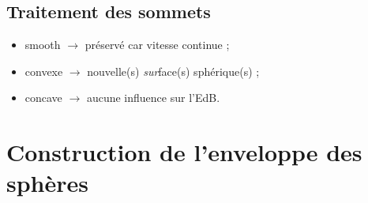 \subsection{Traitement des sommets}
\begin{itemize}
	\item smooth $\to$ préservé car vitesse continue ;
	\item convexe $\to$ nouvelle(s) \textit{sur}face(s) sphérique(s) ;
	\item concave $\to$ aucune influence sur l'EdB.
\end{itemize}





\section{Construction de l'enveloppe des sphères}%


